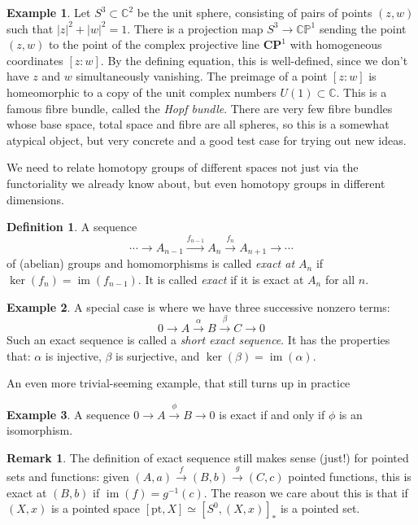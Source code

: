 \documentclass{tufte-handout}
\def\pt {\mathrm{pt}}
\def\CC{\mathbb{C}}
\DeclareMathOperator{\im}{im}
\theoremstyle{definition}
\newtheorem{definition}{Definition}
\newtheorem{example}{Example}
\newtheorem*{rem}{Remark}
\begin{document}
\begin{example}
Let $S^3 \subset \CC^2$ be the unit sphere, consisting of pairs of points $(z,w)$ such that $|z|^2 + |w|^2 = 1$. There is a projection map $S^3 \to \mathbb{CP}^1$ sending the point $(z,w)$ to the point of the complex projective line $\mathbf{CP}^1$ with homogeneous coordinates $[z:w]$. By the defining equation, this is well-defined, since we don't have $z$ and $w$ simultaneously vanishing. The preimage of a point $[z:w]$ is homeomorphic to a copy of the unit complex numbers $U(1) \subset \CC$. This is a famous fibre bundle, called the \emph{Hopf bundle}. There are very few fibre bundles whose base space, total space and fibre are all spheres, so this is a somewhat atypical object, but very concrete and a good test case for trying out new ideas.
\end{example}

We need to relate homotopy groups of different spaces not just via the functoriality we already know about, but even homotopy groups in different dimensions.

\begin{definition}
A sequence
\[
  \cdots \to A_{n-1} \xrightarrow{f_{n-1}} A_n \xrightarrow{f_n} A_{n+1} \to \cdots 
\]
of (abelian) groups and homomorphisms is called \emph{exact at $A_n$} if $\ker(f_n) = \im(f_{n-1})$. It is called \emph{exact} if it is exact at $A_n$ for all $n$.
\end{definition}

\begin{example}
A special case is where we have three successive nonzero terms:
\[
  0\to A \xrightarrow{\alpha} B \xrightarrow{\beta} C \to 0
\]
Such an exact sequence is called a \emph{short exact sequence}. It has the properties that: $\alpha$ is injective, $\beta$ is surjective, and $\ker(\beta) = \im(\alpha)$.
\end{example}

An even more trivial-seeming example, that still turns up in practice

\begin{example}
A sequence $0\to A \xrightarrow{\phi} B \to 0$ is exact if and only if $\phi$ is an isomorphism.
\end{example}

\begin{rem}
The definition of exact sequence still makes sense (just!) for pointed sets and functions: given $(A,a) \xrightarrow{f} (B,b) \xrightarrow{g}  (C,c)$ pointed functions, this is exact at $(B,b)$ if $\im(f) = g^{-1}(c)$. The reason we care about this is that if $(X,x)$ is a pointed space $[\pt,X] \simeq [S^0,(X,x)]_*$ is a pointed set.
\end{rem}
\end{document}
